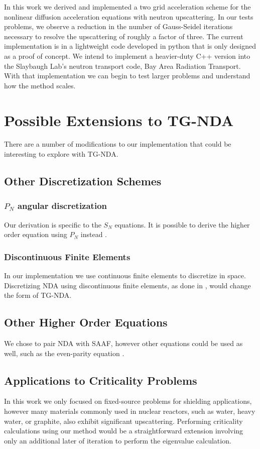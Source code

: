 
In this work we derived and implemented a two grid acceleration scheme for the nonlinear diffusion acceleration equations with neutron upscattering. In our tests problems, we observe a reduction in the number of Gauss-Seidel iterations necessary to resolve the upscattering of roughly a factor of three. The current implementation is in a lightweight code developed in python that is only designed as a proof of concept. We intend to implement a heavier-duty C++ version into the Slaybaugh Lab's neutron transport code, Bay Area Radiation Transport. With that implementation we can begin to test larger problems and understand how the method scales.

\section{Possible Extensions to TG-NDA}
There are a number of modifications to our implementation that could be interesting to explore with TG-NDA. 

\subsection{Other Discretization Schemes}
\subsubsection{$P_N$ angular discretization}
Our derivation is specific to the $S_N$ equations. It is possible to derive the higher order equation using $P_N$ instead \cite{zheng-thesis}. 
\subsubsection{Discontinuous Finite Elements}
In our implementation we use continuous finite elements to discretize in space. Discretizing NDA using discontinuous finite elements, as done in \cite{Schunert2016}, would change the form of TG-NDA. 
\subsection{Other Higher Order Equations}
We chose to pair NDA with SAAF, however other equations could be used as well, such as the even-parity equation \cite{Noh1996}.
\subsection{Applications to Criticality Problems}
In this work we only focused on fixed-source problems for shielding applications, however many materials commonly used in nuclear reactors, such as water, heavy water, or graphite, also exhibit significant upscattering. Performing criticality calculations using our method would be a straightforward extension involving only an additional later of iteration to perform the eigenvalue calculation. 